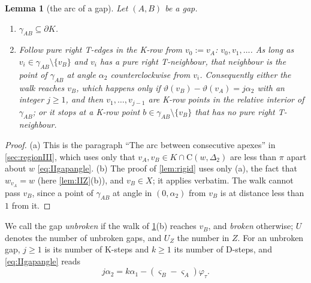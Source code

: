 \documentclass[11pt]{amsart}
\newtheorem{lemma}[theorem]{Lemma}
\theoremstyle{definition}
\theoremstyle{remark}
\newcommand{\Dt}{\Delta_2}
\newcommand{\Cc}{\mathrm{C}}      %
\begin{document}
\begin{lemma}[the arc of a gap]\label{lem:IIarc}
Let $(A,B)$ be a gap.
\begin{enumerate}[label=\textup{(\alph*)}]
\item $\gamma_{AB}\subseteq\partial K$.
\item Follow pure right T-edges in the K-row from $v_0:=v_A$: $v_0,v_1,\dots$. As long as $v_i\in\gamma_{AB}\setminus\{v_B\}$ and $v_i$ has a pure right T-neighbour, that neighbour is the point of $\gamma_{AB}$ at angle $\alpha_2$ counterclockwise from $v_i$. Consequently either the walk reaches $v_B$, which happens only if $\vartheta(v_B)-\vartheta(v_A)=j\alpha_2$ with an integer $j\ge1$, and then $v_1,\dots,v_{j-1}$ are K-row points in the relative interior of $\gamma_{AB}$; or it stops at a K-row point $b\in\gamma_{AB}\setminus\{v_B\}$ that has no pure right T-neighbour.
\end{enumerate}
\end{lemma}
\begin{proof}
(a) This is the paragraph ``The arc between consecutive apexes'' in \cref{sec:regionIII}, which uses only that $v_A,v_B\in K\cap\Cc(w,\Dt)$ are less than $\pi$ apart about $w$ \eqref{eq:IIgapangle}. (b) The proof of \cref{lem:rigid} uses only (a), the fact that $w_{v_A}=w$ (here \cref{lem:IIZ}(b)), and $v_B\in X$; it applies verbatim. The walk cannot pass $v_B$, since a point of $\gamma_{AB}$ at angle in $(0,\alpha_2)$ from $v_B$ is at distance less than $1$ from it.
\end{proof}

We call the gap \emph{unbroken} if the walk of \cref{lem:IIarc}(b) reaches $v_B$, and \emph{broken} otherwise; $U$ denotes the number of unbroken gaps, and $U_Z$ the number in $Z$. For an unbroken gap, $j\ge1$ is its number of K-steps and $k\ge1$ its number of D-steps, and \eqref{eq:IIgapangle} reads
\begin{equation}\label{eq:IIstar}
j\alpha_2=k\alpha_1-(\varsigma_B-\varsigma_A)\varphi_\tau .
\end{equation}
\end{document}
